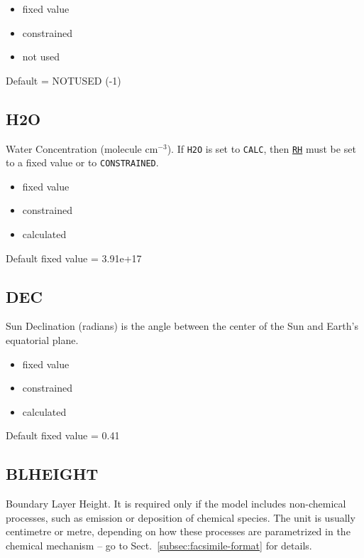 \begin{itemize}
\item fixed value
\item constrained
\item not used
\end{itemize}

Default = NOTUSED (-1)

\subsection{H2O} \label{subsec:h2o}

Water Concentration (molecule cm$^{-3}$). If \texttt{H2O} is set to
\texttt{CALC}, then \hyperref[subsec:rh]{\texttt{RH}} must be set to a
fixed value or to \texttt{CONSTRAINED}.

\begin{itemize}
\item fixed value
\item constrained
\item calculated
\end{itemize}

Default fixed value = 3.91e+17

\subsection{DEC} \label{subsec:dec}

Sun Declination (radians) is the angle between the center of the Sun
and Earth's equatorial plane.

\begin{itemize}
\item fixed value
\item constrained
\item calculated
\end{itemize}

Default fixed value = 0.41

\subsection{BLHEIGHT} \label{subsec:blheight}

Boundary Layer Height. It is required only if the model includes
non-chemical processes, such as emission or deposition of chemical
species. The unit is usually centimetre or metre, depending on how
these processes are parametrized in the chemical mechanism -- go to
Sect.~\ref{subsec:facsimile-format} for details.

